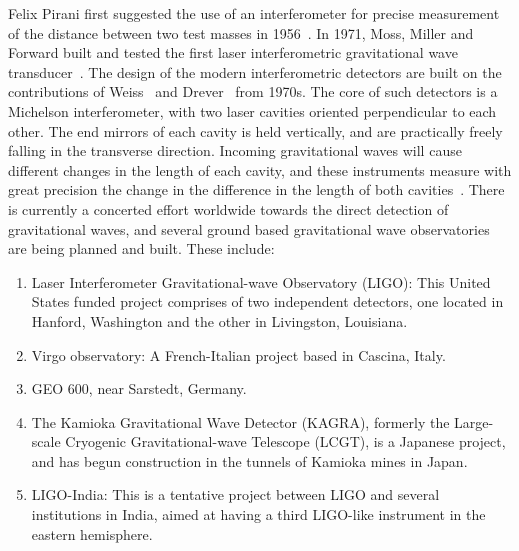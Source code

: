 
Felix Pirani first suggested the use of an interferometer for precise
measurement of the distance between two test masses in 1956~\cite{Pirani:1956}.
In 1971, Moss, Miller and Forward built and tested the first laser
interferometric gravitational wave transducer~\cite{Forward:1971}. The design
of the modern interferometric detectors are built on the contributions 
of Weiss~\cite{Weiss:1972} and Drever~\cite{Drever:1980} from 1970s. The
core of such detectors is a Michelson interferometer, with two laser 
cavities oriented perpendicular to each other. The end mirrors of each 
cavity is held vertically, and are practically freely falling in the 
transverse direction. Incoming gravitational waves will cause different 
changes in the length of each cavity, and these instruments measure with 
great precision the change in the difference in the length of both 
cavities~\cite{Saulson:1995zi}. 
%
There is currently a concerted effort worldwide towards the direct detection 
of gravitational waves, and several ground based gravitational wave observatories 
are being planned and built. These include:
%
\begin{enumerate}
 \item Laser Interferometer Gravitational-wave Observatory (LIGO): This
 United States funded project comprises of two independent detectors, one 
 located in Hanford, Washington and the other in Livingston, Louisiana. 
 \item Virgo observatory: A French-Italian project based in Cascina, Italy.
 \item GEO 600, near Sarstedt, Germany.
 \item The Kamioka Gravitational Wave Detector (KAGRA), formerly the Large-scale
 Cryogenic Gravitational-wave Telescope (LCGT), is a Japanese project, and has
 begun construction in the tunnels of Kamioka mines in Japan.  
 \item LIGO-India: This is a tentative project between LIGO and several 
 institutions in India, aimed at having a third LIGO-like instrument in the 
 eastern hemisphere.
\end{enumerate}
% 
